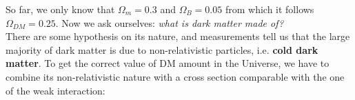 \documentclass[10.75pt,a4paper,openright,bottom=2cm]{article}
\begin{document}
So far, we only know that $\Omega_m=0.3$ and $\Omega_B=0.05$ from which it follows $\Omega_{DM}=0.25$. Now we ask ourselves: \textit{what is dark matter made of?}\\
There are some hypothesis on its nature, 
and measurements tell us that the large majority of dark matter is due to non-relativistic particles, i.e. \textbf{cold dark matter}. To get the correct value of DM amount in the Universe, we have to combine its non-relativistic nature with a cross section comparable with the one of the weak interaction:
\end{document}
